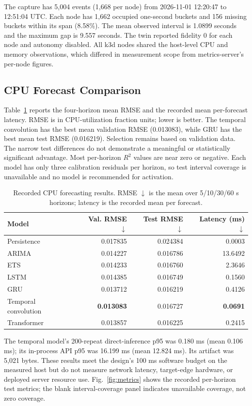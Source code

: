 \documentclass[conference]{IEEEtran}
\begin{document}
The capture has 5,004 events (1,668 per node) from 2026-11-01 12:20:47 to 12:51:04 UTC. Each node has 1,662 occupied one-second buckets and 156 missing buckets within its span (8.58\%). The mean observed interval is 1.0899 seconds and the maximum gap is 9.557 seconds. The twin reported fidelity 0 for each node and autonomy disabled. All k3d nodes shared the host-level CPU and memory observations, which differed in measurement scope from metrics-server's per-node figures.

\subsection{CPU Forecast Comparison}
Table~\ref{tab:forecast} reports the four-horizon mean RMSE and the recorded mean per-forecast latency. RMSE is in CPU-utilization fraction units; lower is better. The temporal convolution has the best mean validation RMSE (0.013083), while GRU has the best mean test RMSE (0.016219). Selection remains based on validation data. The narrow test differences do not demonstrate a meaningful or statistically significant advantage. Most per-horizon $R^2$ values are near zero or negative. Each model has only three calibration residuals per horizon, so test interval coverage is unavailable and no model is recommended for activation.

\begin{table}[t]
\caption{Recorded CPU forecasting results. RMSE $\downarrow$ is the mean over 5/10/30/60 s horizons; latency is the recorded mean per forecast.}
\label{tab:forecast}
\centering
\footnotesize
\begin{tabular}{lrrr}
\toprule
Model & Val. RMSE $\downarrow$ & Test RMSE $\downarrow$ & Latency (ms) $\downarrow$\\
\midrule
Persistence & 0.017835 & 0.024384 & 0.0003\\
ARIMA & 0.014227 & 0.016786 & 13.6492\\
ETS & 0.014233 & 0.016760 & 2.3646\\
LSTM & 0.014385 & 0.016749 & 0.1560\\
GRU & 0.013712 & 0.016219 & 0.4126\\
Temporal convolution & \textbf{0.013083} & 0.016727 & \textbf{0.0691}\\
Transformer & 0.013857 & 0.016225 & 0.2415\\
\bottomrule
\end{tabular}
\end{table}

The temporal model's 200-repeat direct-inference p95 was 0.180 ms (mean 0.106 ms); its in-process API p95 was 16.199 ms (mean 12.824 ms). Its artifact was 5,021 bytes. These results meet the design's 100 ms software budget on the measured host but do not measure network latency, target-edge hardware, or deployed server resource use. Fig.~\ref{fig:metrics} shows the recorded per-horizon test metrics; the blank interval-coverage panel indicates unavailable coverage, not zero coverage.
\end{document}
